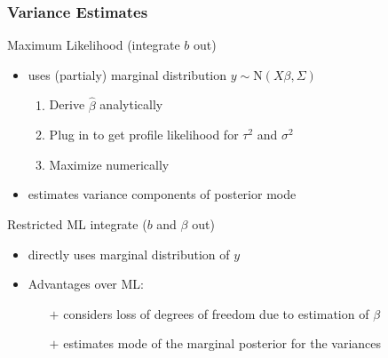 \documentclass[final]{beamer}
\begin{document}
\begin{frame}
\frametitle{Variance Estimates}

\textcolor{beamer@postercolour}{Maximum Likelihood (integrate $b$ out)} 

\begin{itemize}
\item uses (partialy) marginal distribution $y \sim \mathrm{N}(X\beta,\Sigma)$

\begin{enumerate}
\item Derive $\hat{\beta}$ analytically
\item Plug in to get profile likelihood for $\tau^2$ and $\sigma^2$
\item Maximize numerically
\end{enumerate}

\item estimates variance components of posterior mode
\end{itemize}

\vspace{1em}
\pause

\textcolor{beamer@postercolour}{Restricted ML integrate ($b$ and $\beta$ out)}

\begin{itemize}
\item directly uses marginal distribution of $y$

\item Advantages over ML:
\begin{itemize}
\item[$+$] considers loss of degrees of freedom due to estimation of $\beta$ 
\item[$+$] estimates mode of the marginal posterior for the variances
\end{itemize}
\end{itemize}


\end{frame}
\end{document}
